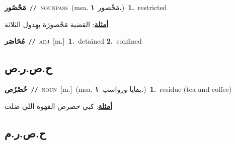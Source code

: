 \documentclass[10pt,a4paper,twoside]{article} %
\begin{document}
\begin{multicols}{2}
{\setlength\topsep{0pt}\textbf{\foreignlanguage{arabic}{مَحْصُور}}\ {\color{gray}\texttt{//}\color{black}}\ \textsc{noun\textunderscore pass}\ \color{gray}(msa. \foreignlanguage{arabic}{مَحْصور}~\foreignlanguage{arabic}{\textbf{١.}})\color{black}\ \textbf{1.}~restricted\  \begin{flushright}\color{gray}\foreignlanguage{arabic}{\textbf{\underline{\foreignlanguage{arabic}{أمثلة}}}: القضية مَحْصورَة بهذول الثلاثة}\end{flushright}\color{black}} \vspace{2mm}

{\setlength\topsep{0pt}\textbf{\foreignlanguage{arabic}{مُحَاصَر}}\ {\color{gray}\texttt{//}\color{black}}\ \textsc{adj}\ [m.]\ \textbf{1.}~detained  \textbf{2.}~confined\ } \vspace{2mm}

\vspace{-3mm}
\subsection*{\color{blue}\foreignlanguage{arabic}{ح.ص.ر.ص}\color{blue}{}} 

{\setlength\topsep{0pt}\textbf{\foreignlanguage{arabic}{حُصْرُص}}\ {\color{gray}\texttt{//}\color{black}}\ \textsc{noun}\ [m.]\ \color{gray}(msa. \foreignlanguage{arabic}{بقايا ورواسب}~\foreignlanguage{arabic}{\textbf{١.}})\color{black}\ \textbf{1.}~residue (tea and coffee)\  \begin{flushright}\color{gray}\foreignlanguage{arabic}{\textbf{\underline{\foreignlanguage{arabic}{أمثلة}}}: كبي حصرص القهوة اللي ضلت}\end{flushright}\color{black}} \vspace{2mm}

\vspace{-3mm}
\subsection*{\color{blue}\foreignlanguage{arabic}{ح.ص.ر.م}\color{blue}{}} 


\end{multicols}
\end{document}
